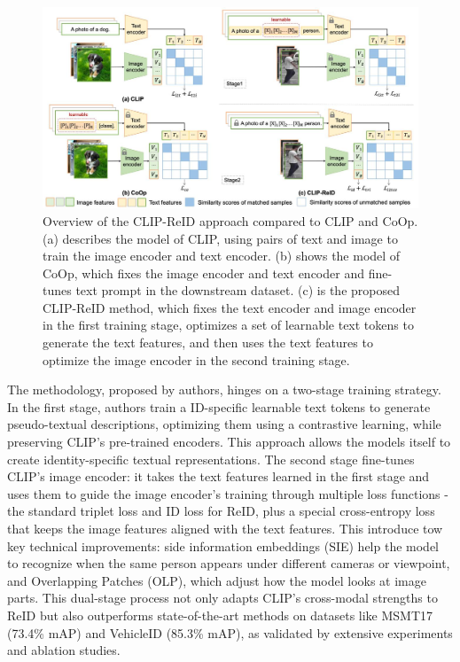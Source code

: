 \documentclass[12pt, a4paper]{article}
\begin{document}
\begin{figure}[h]
    \centering
    \includegraphics[width=0.95\linewidth]{pictures/clip-reid-differ.jpeg}
    \caption{Overview of the CLIP-ReID approach compared to CLIP and CoOp. (a) describes the model of CLIP, using pairs of text and image to train the image encoder and text encoder. (b) shows the model of CoOp, which fixes the image encoder and text encoder and fine-tunes text prompt in the downstream dataset. (c) is the proposed CLIP-ReID method, which fixes the text encoder and image encoder in the first training stage, optimizes a set of learnable text tokens to generate the text features, and then uses the text features to optimize the image encoder in the second training stage.}
    \label{fig:clip-reid-differ}
\end{figure}

The methodology, proposed by authors, hinges on a two-stage training strategy. In the first stage, authors train a ID-specific learnable text tokens to generate pseudo-textual descriptions, optimizing them using a contrastive learning, while preserving CLIP's pre-trained encoders. This approach allows the models itself to create identity-specific textual representations. The second stage fine-tunes CLIP's image encoder: it takes the text features learned in the first stage and uses them to guide the image encoder's training through multiple loss functions - the standard triplet loss and ID loss for ReID, plus a special cross-entropy loss that keeps the image features aligned with the text features. This introduce tow key technical improvements: side information embeddings (SIE) help the model to recognize when the same person appears under different cameras or viewpoint, and Overlapping Patches (OLP), which adjust how the model looks at image parts. This dual-stage process not only adapts CLIP’s cross-modal strengths to ReID but also outperforms state-of-the-art methods on datasets like MSMT17 (73.4\% mAP) and VehicleID (85.3\% mAP), as validated by extensive experiments and ablation studies. 
\end{document}
